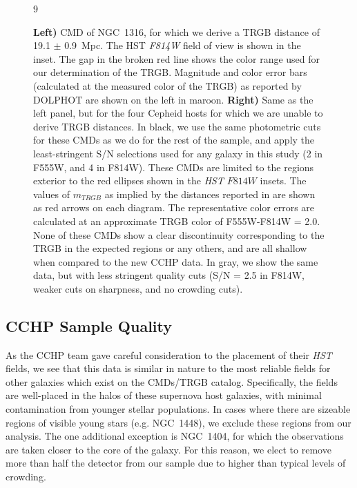 \documentclass[twocolumn]{aastex62}
\begin{document}
\begin{figure*}
9\caption{\textbf{Left)} CMD of NGC~1316, for which we derive a TRGB distance of 19.1 $\pm$ 0.9~Mpc. The HST \textit{F814W} field of view is shown in the inset. The gap in the broken red line shows the color range used for our determination of the TRGB. Magnitude and color error bars (calculated at the measured color of the TRGB) as reported by DOLPHOT are shown on the left in maroon. \textbf{Right)} Same as the left panel, but for the four Cepheid hosts for which we are unable to derive TRGB distances. In black, we use the same photometric cuts for these CMDs as we do for the rest of the sample, and apply the least-stringent S/N selections used for any galaxy in this study (2 in F555W, and 4 in F814W). These CMDs are limited to the regions exterior to the red ellipses shown in the \textit{HST} $F814W$ insets. The values of $m_{TRGB}$ as implied by the distances reported in \cite{2019ApJ...882...34F} are shown as red arrows on each diagram. The representative color errors are calculated at an approximate TRGB color of F555W-F814W = 2.0. None of these CMDs show a clear discontinuity corresponding to the TRGB in the expected regions or any others, and are all shallow when compared to the new CCHP data. In gray, we show the same data, but with less stringent quality cuts (S/N = 2.5 in F814W,  weaker cuts on sharpness, and no crowding cuts). }
\label{CepheidHosts}
\end{figure*}


\subsection{CCHP Sample Quality}

As the CCHP team gave careful consideration to the placement of their \textit{HST} fields, we see that this data is similar in nature to the most reliable fields for other galaxies which exist on the CMDs/TRGB catalog. Specifically, the fields are well-placed in the halos of these supernova host galaxies, with minimal contamination from younger stellar populations. In cases where there are sizeable regions of visible young stars (e.g. NGC~1448), we exclude these regions from our analysis. The one additional exception is NGC~1404, for which the observations are taken closer to the core of the galaxy. For this reason, we elect to remove more than half the detector from our sample due to higher than typical levels of crowding.
\end{document}
